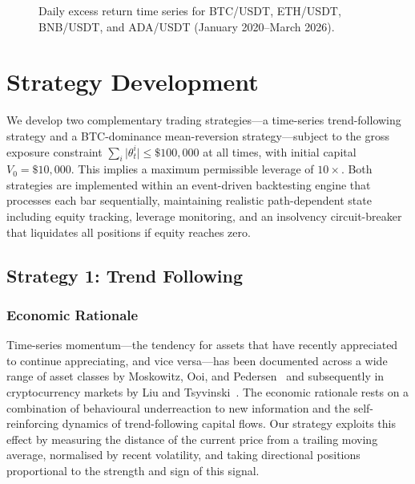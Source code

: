 \documentclass[11pt,a4paper]{article}
\newcommand{\abs}[1]{\lvert #1 \rvert}
\begin{document}
\begin{figure}[H]
  \centering
  \caption{Daily excess return time series for BTC/USDT, ETH/USDT, BNB/USDT, and ADA/USDT (January 2020--March 2026).}
  \label{fig:return-ts}
\end{figure}


\section{Strategy Development}
\label{sec:strategy}

We develop two complementary trading strategies---a time-series trend-following strategy and a BTC-dominance mean-reversion strategy---subject to the gross exposure constraint $\sum_i \abs{\theta^i_t} \leq \$100{,}000$ at all times, with initial capital $V_0 = \$10{,}000$.  This implies a maximum permissible leverage of $10\times$.  Both strategies are implemented within an event-driven backtesting engine that processes each bar sequentially, maintaining realistic path-dependent state including equity tracking, leverage monitoring, and an insolvency circuit-breaker that liquidates all positions if equity reaches zero.

\subsection{Strategy 1: Trend Following}
\label{sec:trend}

\subsubsection{Economic Rationale}

Time-series momentum---the tendency for assets that have recently appreciated to continue appreciating, and vice versa---has been documented across a wide range of asset classes by Moskowitz, Ooi, and Pedersen~\cite{moskowitz2012} and subsequently in cryptocurrency markets by Liu and Tsyvinski~\cite{liu2021}.  The economic rationale rests on a combination of behavioural underreaction to new information and the self-reinforcing dynamics of trend-following capital flows.  Our strategy exploits this effect by measuring the distance of the current price from a trailing moving average, normalised by recent volatility, and taking directional positions proportional to the strength and sign of this signal.
\end{document}
